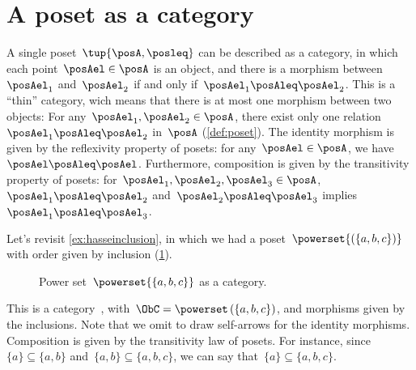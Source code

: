 

\section{A poset as a category}
\label{sec:posetsarecats}
A single poset~$\tup{\posA, \posleq}$ can be described as a category, in which each point~$\posAel\in \posA$ is an object, and there is a morphism between~$\posAel_1$ and~$\posAel_2$ if and only if~$\posAel_1 \posAleq \posAel_2$. This is a ``thin'' category, wich means that there is at most one morphism
between two objects: For any~$\posAel_1,\posAel_2\in \posA$, there exist only one relation~$\posAel_1\posAleq \posAel_2$ in~$\posA$ (\cref{def:poset}). The identity morphism is given by the reflexivity property of posets: for any~$\posAel\in \posA$, we have~$\posAel \posAleq \posAel$. Furthermore, composition is given by the transitivity property of posets: for~$\posAel_1,\posAel_2,\posAel_3 \in \posA$,~$\posAel_1\posAleq \posAel_2$ and~$\posAel_2\posAleq \posAel_3$ implies~$\posAel_1\posAleq \posAel_3$.

\begin{example}
  Let's revisit \cref{ex:hasseinclusion}, in which we had a poset~$\powerset{\left(\{a,b,c\}\right)}$ with order given by inclusion (\cref{fig:posetascat}).

  \begin{figure}[h!]
    \begin{center}
    \end{center}
    \caption{Power set~$\powerset{\{a,b,c\}}$ as a category. \label{fig:posetascat}}
  \end{figure}

  This is a category~\CatC, with~$\ObC=\powerset\left(\{a,b,c\}\right)$, and morphisms given by the inclusions. Note that we omit to draw self-arrows for the identity morphisms. Composition is given by the transitivity law of posets. For instance, since~$\{a\}\subseteq \{a,b\}$ and~$\{a,b\} \subseteq \{a,b,c\}$, we can say that~$\{a\}\subseteq \{a,b,c\}$.
\end{example}

